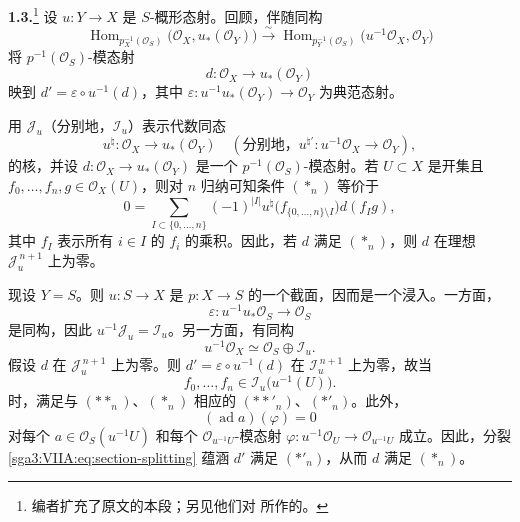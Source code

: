 
\medskip
\noindent\textbf{1.3.}\footnote{编者扩充了原文的本段；另见他们对 所作的。}
\label{sga3:VIIA:1.3}
设 \(u:Y\to X\) 是 \(S\)-概形态射。回顾，伴随同构
\[
 \operatorname{Hom}_{p_X^{-1}(\mathcal O_S)}
   \bigl(\mathcal O_X,u_*(\mathcal O_Y)\bigr)
 \xrightarrow{\sim}
 \operatorname{Hom}_{p_Y^{-1}(\mathcal O_S)}
   \bigl(u^{-1}\mathcal O_X,\mathcal O_Y\bigr)
\]
将 \(p^{-1}(\mathcal O_S)\)-模态射
\[
  d:\mathcal O_X\longrightarrow u_*(\mathcal O_Y)
\]
映到 \(d'=\varepsilon\circ u^{-1}(d)\)，其中 \(\varepsilon:u^{-1}u_*(\mathcal O_Y)\to\mathcal O_Y\) 为典范态射。

用 \(\mathcal J_u\)（分别地，\(\mathcal I_u\)）表示代数同态
\[
 u^\natural:\mathcal O_X\longrightarrow u_*(\mathcal O_Y)
 \quad
 \left(\text{分别地，}
 u^{\natural\prime}:u^{-1}\mathcal O_X\longrightarrow\mathcal O_Y
 \right),
\]
的核，并设 \(d:\mathcal O_X\to u_*(\mathcal O_Y)\) 是一个 \(p^{-1}(\mathcal O_S)\)-模态射。若 \(U\subset X\) 是开集且 \(f_0,\ldots,f_n,g\in\mathcal O_X(U)\)，则对 \(n\) 归纳可知条件 \((\ast_n)\) 等价于
\begin{equation}
  0=
  \sum_{I\subset\{0,\ldots,n\}}
  (-1)^{|I|}
  u^\natural\bigl(f_{\{0,\ldots,n\}\setminus I}\bigr)d(f_Ig),
  \tag{\(\ast\ast_n\)}
  \label{sga3:VIIA:eq:starstar-n}
\end{equation}
其中 \(f_I\) 表示所有 \(i\in I\) 的 \(f_i\) 的乘积。因此，若 \(d\) 满足 \((\ast_n)\)，则 \(d\) 在理想 \(\mathcal J_u^{\,n+1}\) 上为零。

现设 \(Y=S\)。则 \(u:S\to X\) 是 \(p:X\to S\) 的一个截面，因而是一个浸入。一方面，
\[
 \varepsilon:u^{-1}u_*\mathcal O_S\longrightarrow\mathcal O_S
\]
是同构，因此 \(u^{-1}\mathcal J_u=\mathcal I_u\)。另一方面，有同构
\begin{equation}
  u^{-1}\mathcal O_X\simeq\mathcal O_S\oplus\mathcal I_u.
  \tag{\(\star\)}
  \label{sga3:VIIA:eq:section-splitting}
\end{equation}
假设 \(d\) 在 \(\mathcal J_u^{\,n+1}\) 上为零。则 \(d'=\varepsilon\circ u^{-1}(d)\) 在 \(\mathcal I_u^{\,n+1}\) 上为零，故当
\[
 f_0,\ldots,f_n\in\mathcal I_u\bigl(u^{-1}(U)\bigr).
\]
时，满足与 \((\ast\ast_n)\)、\((\ast_n)\) 相应的 \((\ast\ast'_n)\)、\((\ast'_n)\)。此外，
\[
  (\operatorname{ad}a)(\varphi)=0
\]
对每个 \(a\in\mathcal O_S(u^{-1}U)\) 和每个 \(\mathcal O_{u^{-1}U}\)-模态射 \(\varphi:u^{-1}\mathcal O_U\to\mathcal O_{u^{-1}U}\) 成立。因此，分裂 \eqref{sga3:VIIA:eq:section-splitting} 蕴涵 \(d'\) 满足 \((\ast'_n)\)，从而 \(d\) 满足 \((\ast_n)\)。

